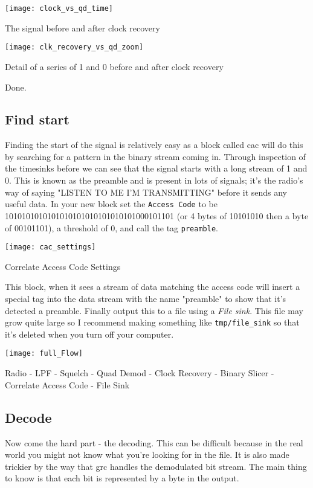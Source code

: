 \centrefigurestart
\texttt{[image: clock\_vs\_qd\_time]}
\caption{The signal before and after clock recovery}
\label{binslice}
\centrefigureend

\centrefigurestart
\texttt{[image: clk\_recovery\_vs\_qd\_zoom]}
\caption{Detail of a series of 1 and 0 before and after clock recovery}
\label{bindetail}
\centrefigureend


Done.

\subsection{Find start}
Finding the start of the signal is relatively easy as a block called \Gls{cac} will do this by searching for a pattern in the binary stream coming in. Through inspection of the \gls{timesink}s before we can see that the signal starts with a long stream of 1 and 0. This is known as the \gls{preamble} and is present in lots of signals; it's the radio's way of saying "LISTEN TO ME I'M TRANSMITTING" before it sends any useful data. In your new block set the \verb|Access Code| to be 1010101010101010101010101010101000101101 (or 4 bytes of 10101010 then a byte of 00101101), a threshold of 0, and call the tag \verb|preamble|.

\centrefigurestart
\texttt{[image: cac\_settings]}
\caption{Correlate Access Code Settings}
\centrefigureend

This block, when it sees a stream of data matching the access code will insert a special tag into the data stream with the name "preamble" to show that it's detected a \gls{preamble}. Finally output this to a file using a \textit{File \Gls{sink}}. This file may grow quite large so I recommend making something like \verb|tmp/file_sink| so that it's deleted when you turn off your computer.

\centrefigurestart
\texttt{[image: full\_Flow]}
\caption{Radio - LPF - Squelch - Quad Demod - Clock Recovery - Binary Slicer - Correlate Access Code - File Sink}
\centrefigureend

\subsection{Decode}
Now come the hard part - the decoding. This can be difficult because in the real world you might not know what you're looking for in the file. It is also made trickier by the way that \gls{grc} handles the demodulated bit stream. The main thing to know is that each bit is represented by a byte in the output. 

